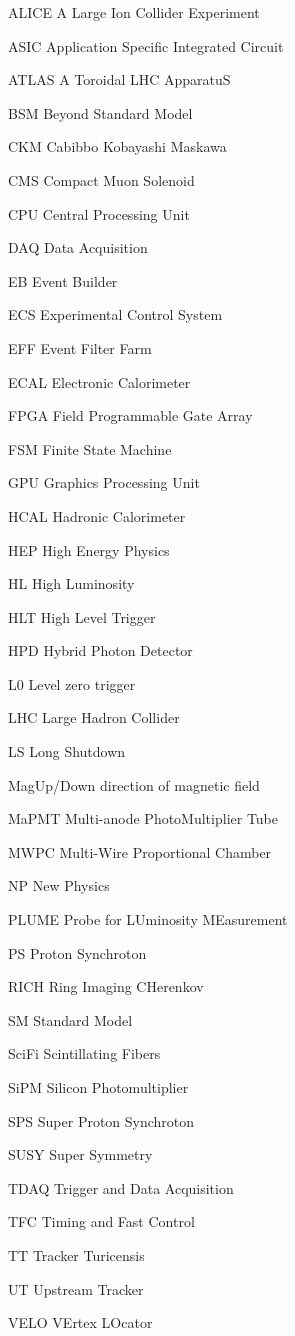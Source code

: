 \begin{abbreviations}
    \item[ALICE] A Large Ion Collider Experiment
    \item[ASIC] Application Specific Integrated Circuit
    \item[ATLAS] A Toroidal LHC ApparatuS
    \item[BSM] Beyond Standard Model
    \item[CKM] Cabibbo Kobayashi Maskawa
    \item[CMS] Compact Muon Solenoid
    \item[CPU] Central Processing Unit
    \item[DAQ] Data Acquisition
    \item[EB] Event Builder
    \item[ECS] Experimental Control System
    \item[EFF] Event Filter Farm
    \item[ECAL] Electronic Calorimeter
    \item[FPGA] Field Programmable Gate Array
    \item[FSM] Finite State Machine
    \item[GPU] Graphics Processing Unit
    \item[HCAL] Hadronic Calorimeter
    \item[HEP] High Energy Physics
    \item[HL] High Luminosity
    \item[HLT] High Level Trigger
    \item[HPD] Hybrid Photon Detector
    \item[L0] Level zero trigger
    \item[LHC] Large Hadron Collider
    \item[LS] Long Shutdown
    \item[MagUp/Down] direction of magnetic field
    \item[MaPMT] Multi-anode PhotoMultiplier Tube
    \item[MWPC] Multi-Wire Proportional Chamber
    \item[NP] New Physics
    \item[PLUME] Probe for LUminosity MEasurement
    \item[PS] Proton Synchroton
    \item[RICH] Ring Imaging CHerenkov
    \item[SM] Standard Model
    \item[SciFi] Scintillating Fibers
    \item[SiPM] Silicon Photomultiplier
    \item[SPS] Super Proton Synchroton
    \item[SUSY] Super Symmetry
    \item[TDAQ] Trigger and Data Acquisition
    \item[TFC] Timing and Fast Control
    
    \item[TT] Tracker Turicensis
    \item[UT] Upstream Tracker
    \item[VELO] VErtex LOcator
\end{abbreviations}

